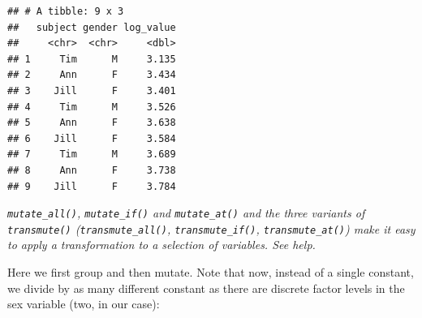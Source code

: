 \documentclass[]{book}
\newenvironment{Shaded}{\begin{snugshade}}{\end{snugshade}}
\newcommand{\KeywordTok}[1]{\textcolor[rgb]{0.13,0.29,0.53}{\textbf{#1}}}
\newcommand{\DataTypeTok}[1]{\textcolor[rgb]{0.13,0.29,0.53}{#1}}
\newcommand{\DecValTok}[1]{\textcolor[rgb]{0.00,0.00,0.81}{#1}}
\newcommand{\StringTok}[1]{\textcolor[rgb]{0.31,0.60,0.02}{#1}}
\newcommand{\OperatorTok}[1]{\textcolor[rgb]{0.81,0.36,0.00}{\textbf{#1}}}
\newcommand{\NormalTok}[1]{#1}
\begin{document}
\begin{verbatim}
## # A tibble: 9 x 3
##   subject gender log_value
##     <chr>  <chr>     <dbl>
## 1     Tim      M     3.135
## 2     Ann      F     3.434
## 3    Jill      F     3.401
## 4     Tim      M     3.526
## 5     Ann      F     3.638
## 6    Jill      F     3.584
## 7     Tim      M     3.689
## 8     Ann      F     3.738
## 9    Jill      F     3.784
\end{verbatim}

\begin{Shaded}
\end{Shaded}

\emph{\texttt{mutate\_all()}, \texttt{mutate\_if()} and
\texttt{mutate\_at()} and the three variants of \texttt{transmute()}
(\texttt{transmute\_all()}, \texttt{transmute\_if()},
\texttt{transmute\_at()}) make it easy to apply a transformation to a
selection of variables. See help.}

Here we first group and then mutate. Note that now, instead of a single
constant, we divide by as many different constant as there are discrete
factor levels in the sex variable (two, in our case):

\begin{Shaded}
\end{Shaded}
\end{document}
